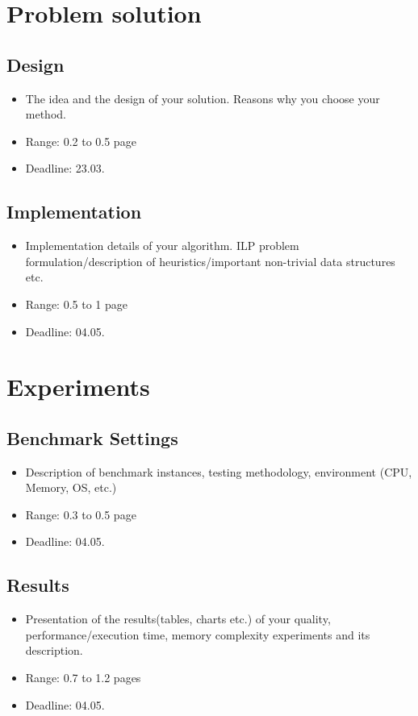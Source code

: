 \documentclass[onecolumn, conference]{IEEEtran}
\newcommand{\secondDeadline}{Deadline: 23.03.\,\the\year}
\newcommand{\fourthDeadline}{Deadline: 04.05.\,\the\year}
\newcommand{\range}[2][0]{Range: #1 to #2 page}
\newcommand{\conciseItem}{\itemsep1pt \parskip0pt \parsep0pt}
\begin{document}
\section{Problem solution}
\subsection{Design}
\begin{itemize}
	\conciseItem
	\item The idea and the design of your solution. Reasons why you choose your method.
	\item \range[0.2]{0.5}
	\item \secondDeadline
\end{itemize}
\subsection{Implementation}
\begin{itemize}
	\conciseItem
	\item Implementation details of your algorithm. ILP problem formulation/description of heuristics/important non-trivial data structures etc.
	\item \range[0.5]{1}
	\item \fourthDeadline
\end{itemize}
\section{Experiments}
\subsection{Benchmark Settings}
\begin{itemize}
	\conciseItem
	\item Description of benchmark instances, testing methodology, environment (CPU, Memory, OS, etc.)
	\item \range[0.3]{0.5}
	\item \fourthDeadline
\end{itemize}
\subsection{Results}
\begin{itemize}
	\conciseItem
	\item Presentation of the results(tables, charts etc.) of your quality, performance/execution time, memory complexity experiments and its description.
	\item \range[0.7]{1.2}s
	\item \fourthDeadline
\end{itemize}
\end{document}
